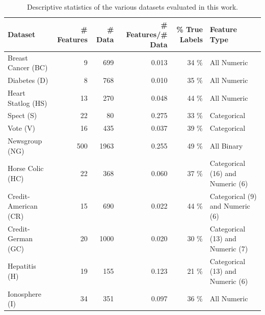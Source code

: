 \begin{table}[tbp!]
\centering
{\small 
\begin{tabular}{|l|r|r|r|r|l|} \hline
Dataset & \# Features & \# Data & \# Features/\# Data & \% True Labels & Feature Type\\ \hline \hline 
Breast Cancer (BC)	& 9	& 699	& 0.013	& 34 \%	& All Numeric\\ \hline
Diabetes (D)        & 8	& 768	& 0.010	& 35 \%	& All Numeric\\ \hline
Heart Statlog (HS)	& 13	& 270	& 0.048	& 44 \%	& All Numeric\\ \hline
Spect (S)	        & 22	& 80	& 0.275 & 33 \%	& Categorical\\ \hline
Vote (V)	        & 16	& 435	& 0.037	& 39 \%	& Categorical\\ \hline
Newsgroup (NG)	& 500	& 1963	& 0.255	& 49 \%	& All Binary\\ \hline
Horse Colic (HC)	& 22	& 368	& 0.060	& 37 \%	& Categorical (16) and Numeric (6)\\ \hline
Credit-American (CR)	& 15	& 690	& 0.022	& 44 \%	& Categorical (9) and Numeric (6)\\ \hline
Credit-German (GC)	& 20	& 1000	& 0.020 & 30 \%	& Categorical (13) and Numeric (7)\\ \hline
Hepatitis (H)	& 19	& 155	& 0.123	& 21 \%	& Categorical (13) and Numeric (6)\\ \hline
Ionosphere (I)	& 34	& 351	& 0.097	& 36 \%	& All Numeric\\ \hline
\end{tabular}}
\vspace{-2mm}
\caption{\footnotesize Descriptive statistics of the various datasets evaluated in this work.}
\label{table:stats}
\vspace{-3.5mm}
\end{table}

